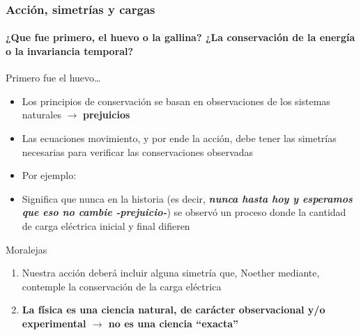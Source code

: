 \documentclass[xetex,mathserif,serif,10pt]{beamer}
\begin{document}
\begin{frame}
	\frametitle{Acción, simetrías y cargas}
  \framesubtitle{\alert{¿Que fue primero, el huevo o la gallina? ¿La conservación de la energía o la invariancia temporal?}}
  \begin{block}{Primero fue el huevo\ldots}
    \begin{itemize}
      \item Los principios de conservación se basan en observaciones de los sistemas naturales $\rightarrow$ {\bf{prejuicios}}
      \item \alert{Las ecuaciones movimiento, y por ende la acción, debe tener las simetrías necesarias para verificar las conservaciones observadas}
      \item Por ejemplo: {\color{chart04}{``La carga [eléctrica] es una magnitud conservada''}}
      \item Significa que nunca en la historia (es decir, {\bf{\emph{nunca hasta hoy y esperamos que eso no cambie -prejuicio-}}}) se observó un proceso donde la cantidad de carga eléctrica inicial y final difieren
    \end{itemize}
  \end{block}
  \begin{alertblock}{Moralejas}
    \begin{enumerate}
      \item Nuestra acción deberá incluir alguna simetría que, Noether mediante, contemple la conservación de la carga eléctrica
      \item \bf{La física es una ciencia natural, de carácter observacional y/o experimental $\rightarrow$ no es una ciencia ``exacta''}
    \end{enumerate}
  \end{alertblock}
\end{frame}
\end{document}
